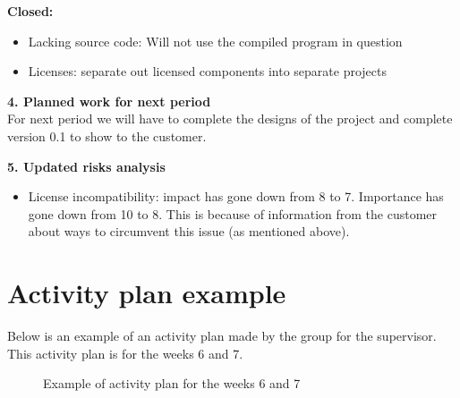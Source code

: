 \textbf{Closed:}
\begin{itemize}
	\item{Lacking source code: Will not use the compiled program in question}
	\item{Licenses: separate out licensed components into separate projects}
\end{itemize}
\vspace{8mm}

\textbf{4. Planned work for next period}\\
For next period we will have to complete the designs of the project and complete version 0.1 to show to the customer.\\
\newline

\textbf{5. Updated risks analysis}\\
\begin{itemize}
	\item{License incompatibility: impact has gone down from 8 to 7. Importance has gone down from 10 to 8. This is because of information from the customer about ways to circumvent this issue (as mentioned above).}
\end{itemize}

\section{Activity plan example}
Below is an example of an activity plan made by the group for the supervisor. This activity plan is for the weeks 6 and 7.\\

\begin{figure}[H]
\caption{Example of activity plan for the weeks 6 and 7}
\end{figure}
